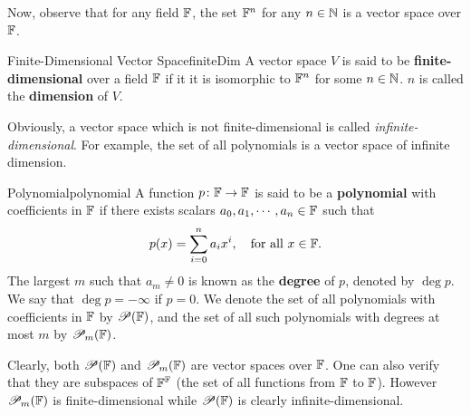 \documentclass[math, code]{amznotes}
\theoremstyle{remark}
\begin{document}
Now, observe that for any field $\mathbb{F}$, the set $\mathbb{F}^n$ for any $n \in \mathbb{N}$ is a vector space over $\mathbb{F}$.
\begin{dfnbox}{Finite-Dimensional Vector Space}{finiteDim}
    A vector space $V$ is said to be {\color{red} \textbf{finite-dimensional}} over a field $\mathbb{F}$ if it it is isomorphic to $\mathbb{F}^n$ for some $n \in \mathbb{N}$. $n$ is called the {\color{red} \textbf{dimension}} of $V$.
\end{dfnbox}
Obviously, a vector space which is not finite-dimensional is called \textit{infinite-dimensional}. For example, the set of all polynomials is a vector space of infinite dimension.
\begin{dfnbox}{Polynomial}{polynomial}
    A function $p \colon \mathbb{F} \to \mathbb{F}$ is said to be a {\color{red} \textbf{polynomial}} with coefficients in $\mathbb{F}$ if there exists scalars $a_0, a_1, \cdots, a_n \in \mathbb{F}$ such that 
    \begin{equation*}
        p(x) = \sum_{i = 0}^{n}a_ix^i, \quad\textrm{for all } x \in \mathbb{F}.
    \end{equation*}
    The largest $m$ such that $a_m \neq 0$ is known as the {\color{red} \textbf{degree}} of $p$, denoted by $\deg p$. We say that $\deg p = -\infty$ if $p = 0$. We denote the set of all polynomials with coefficients in $\mathbb{F}$ by $\mathscr{P}(\mathbb{F})$, and the set of all such polynomials with degrees at most $m$ by $\mathscr{P}_m(\mathbb{F})$.
\end{dfnbox}
Clearly, both $\mathscr{P}(\mathbb{F})$ and $\mathscr{P}_m(\mathbb{F})$ are vector spaces over $\mathbb{F}$. One can also verify that they are subspaces of $\mathbb{F}^{\mathbb{F}}$ (the set of all functions from $\mathbb{F}$ to $\mathbb{F}$). However $\mathscr{P}_m(\mathbb{F})$ is finite-dimensional while $\mathscr{P}(\mathbb{F})$ is clearly infinite-dimensional.
\end{document}

